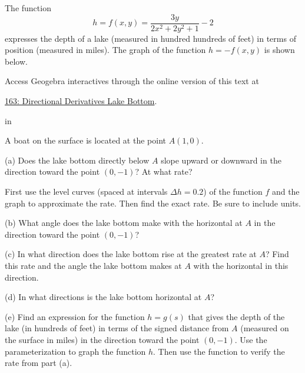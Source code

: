 \documentclass{ximera}
\newcommand{\pskip}{\vskip 0.1 in}
\begin{document}
\begin{exploration} \label{Esdft4ew3}

The function
\[
     h = f(x,y) = \frac{3y}{2x^2+2y^2+1}-2 
\]
expresses the depth of a lake (measured in hundred hundreds of feet) in terms of position (measured in miles). The graph of the function $h= - f(x,y)$ is shown below.

 
\begin{onlineOnly}
    \begin{center}
\end{center}
\end{onlineOnly}

Access Geogebra interactives through the online version of this text at
 
\href{https://www.geogebra.org/classic/md2udchf}{163: Directional Derivatives Lake Bottom}.

\pskip

A boat on the surface is located at the point $A(1,0)$.

(a) Does the lake bottom directly below $A$ slope upward or downward in the direction toward the point $(0,-1)$? At what rate? 

First use the level curves (spaced at intervals $\Delta h = 0.2$) of the function $f$ and the graph to approximate the rate. Then find the exact rate. Be sure to include units.

(b) What angle does the lake bottom make with the horizontal at $A$ in the direction toward the point $(0,-1)$?

(c) In what direction does the lake bottom rise at the greatest rate at $A$? Find this rate and the angle the lake bottom makes at $A$ with the horizontal in this direction.

(d) In what directions is the lake bottom horizontal at $A$?

(e) Find an expression for the function $h=g(s)$ that gives the depth of the lake (in hundreds of feet) in terms of the signed distance from $A$ (measured on the surface in miles) in the direction toward the point $(0,-1)$. Use the parameterization to graph the function $h$. Then use the function to verify the rate from part (a). 

\end{exploration}
\end{document}
